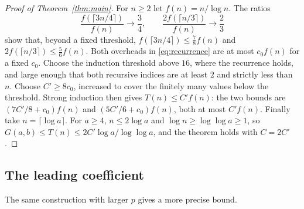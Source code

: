 \documentclass[11pt]{article}
\theoremstyle{remark}
\begin{document}
\begin{proof}[Proof of Theorem~\ref{thm:main}]
For $n\geq2$ let $f(n)=n/\log n$. The ratios
\[
\frac{f(\lceil3n/4\rceil)}{f(n)}\longrightarrow\frac34,
\qquad
\frac{2f(\lceil n/3\rceil)}{f(n)}\longrightarrow\frac23
\]
show that, beyond a fixed threshold, $f(\lceil3n/4\rceil)\leq\tfrac78f(n)$ and
$2f(\lceil n/3\rceil)\leq\tfrac56f(n)$. Both overheads in
\eqref{eq:recurrence} are at most $c_0f(n)$ for a fixed $c_0$. Choose the
induction threshold above $16$, where the recurrence holds, and large enough
that both recursive indices are at least $2$ and strictly less than $n$. Choose
$C'\geq8c_0$, increased to cover the finitely many values below the threshold.
Strong induction then gives $T(n)\leq C'f(n)$: the two bounds are
$(7C'/8+c_0)f(n)$ and $(5C'/6+c_0)f(n)$, both at most $C'f(n)$.
Finally take $n=\lceil\log a\rceil$. For $a\geq4$, $n\leq2\log a$ and
$\log n\geq\log\log a\geq1$, so $G(a,b)\leq T(n)\leq2C'\log a/\log\log a$,
and the theorem holds with $C=2C'$.
\end{proof}

\subsection{The leading coefficient}
The same construction with larger $p$ gives a more precise bound.
\end{document}
